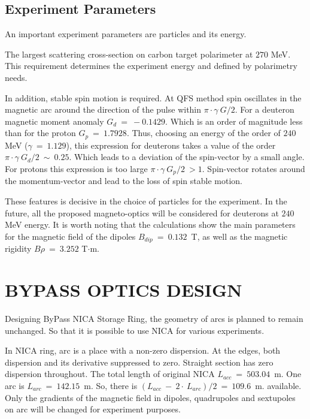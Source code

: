 \documentclass[a4paper]{jpconf}
\begin{document}
\subsection{Experiment Parameters}

\par An important experiment parameters are particles and its energy.
\par The largest scattering cross-section on carbon target polarimeter at $270$ MeV\cite{FS}.
This requirement determines the experiment energy and defined by polarimetry needs.
\par In addition, stable spin motion is required.
At QFS method spin oscillates in the magnetic arc around the direction of the pulse within $\pi\cdot\gamma~G/2$. 
For a deuteron magnetic moment anomaly $G_d~=~-0.1429$. Which is an order of magnitude less than for the proton $G_p~=~1.7928$.
Thus, choosing an energy of the order of $240$ MeV ($\gamma~=~1.129$), 
this expression for deuterons takes a value of the order $\pi\cdot\gamma~G_d/2~\sim~0.25$. 
Which leads to a deviation of the spin-vector by a small angle.
For protons this expression is too large $\pi\cdot\gamma~G_p/2~>1$. Spin-vector rotates around the momentum-vector and lead to the loss of spin stable motion.

\par These features is decisive in the choice of particles for the experiment. In the future, all the proposed magneto-optics will be considered for deuterons at $240$ MeV energy. It is worth noting that the calculations show the main parameters for the magnetic field of the dipoles $B_{dip}~=~0.132$~T, as well as the magnetic rigidity $B\rho~=~3.252$ T$\cdot$m.

\section{BYPASS OPTICS DESIGN}

\par Designing ByPass NICA Storage Ring, 
the geometry of arcs is planned to remain unchanged. 
So that it is possible to use NICA for various experiments. 
\par In NICA ring, arc is a place with a non-zero dispersion. At the edges, 
both dispersion and its derivative suppressed to zero. Straight section has zero dispersion throughout. 
The total length of original NICA $L_{acc}~=~503.04$~m. One arc is $L_{arc}~=~142.15$~m. 
So, there is $(L_{acc}~-~2\cdot~L_{arc})/2~=~109.6$~m. available.
Only the gradients of the magnetic field in dipoles, quadrupoles and sextupoles on arc will be changed for experiment purposes.
\end{document}
